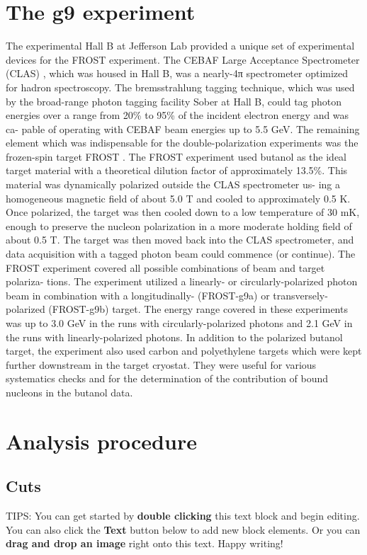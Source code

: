 
\tableofcontents

\section{The g9 experiment}
The experimental Hall B at Jefferson Lab provided a unique set of experimental devices for the
FROST experiment. The CEBAF Large Acceptance Spectrometer (CLAS)\cite{CLAS} , which was housed
in Hall B, was a nearly-4π spectrometer optimized for hadron spectroscopy. The bremsstrahlung
tagging technique, which was used by the broad-range photon tagging facility Sober\cite{Sober_2000} at Hall B, could
tag photon energies over a range from 20\% to 95\% of the incident electron energy and was ca-
pable of operating with CEBAF beam energies up to 5.5 GeV. The remaining element which was
indispensable for the double-polarization experiments was the frozen-spin target FROST \cite{Keith_2012}. The
FROST experiment used butanol as the ideal target material with a theoretical dilution factor of
approximately 13.5\%. This material was dynamically polarized outside the CLAS spectrometer us-
ing a homogeneous magnetic field of about 5.0 T and cooled to approximately 0.5 K. Once polarized,
the target was then cooled down to a low temperature of 30 mK, enough to preserve the nucleon
polarization in a more moderate holding field of about 0.5 T. The target was then moved back
into the CLAS spectrometer, and data acquisition with a tagged photon beam could commence (or
continue). The FROST experiment covered all possible combinations of beam and target polariza-
tions. The experiment utilized a linearly- or circularly-polarized photon beam in combination with
a longitudinally- (FROST-g9a) or transversely-polarized (FROST-g9b) target. The energy range
covered in these experiments was up to 3.0 GeV in the runs with circularly-polarized photons and
2.1 GeV in the runs with linearly-polarized photons. In addition to the polarized butanol target,
the experiment also used carbon and polyethylene targets which were kept further downstream in
the target cryostat. They were useful for various systematics checks and for the determination of
the contribution of bound nucleons in the butanol data.

\section{Analysis procedure}
\subsection{Cuts}



TIPS:
You can get started by \textbf{double clicking} this text block and begin editing. You can also click the \textbf{Text} button below to add new block elements. Or you can \textbf{drag and drop an image} right onto this text. Happy writing!
